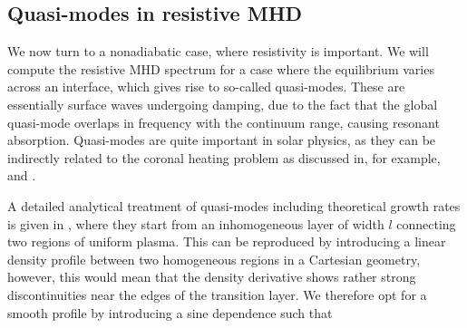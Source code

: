 \subsection{Quasi-modes in resistive MHD}
We now turn to a nonadiabatic case, where resistivity is important. We will compute the resistive MHD spectrum for a case where the equilibrium varies across an interface, which gives rise to so-called quasi-modes. These are essentially surface waves undergoing damping, due to the fact that the global quasi-mode overlaps in frequency with the continuum range, causing resonant absorption. Quasi-modes are quite important in solar physics, as they can be indirectly related to the coronal heating problem as discussed in, for example, \citet{poedts1989} and \citet{poedts1991}.

A detailed analytical treatment of quasi-modes including theoretical growth rates is given in \citet{book_priest}, where they start from an inhomogeneous layer of width $l$ connecting two regions of uniform plasma. This can be reproduced by introducing a linear density profile between two homogeneous regions in a Cartesian geometry, however, this would mean that the density derivative shows rather strong discontinuities near the edges of the transition layer. We therefore opt for a smooth profile by introducing a sine dependence such that

